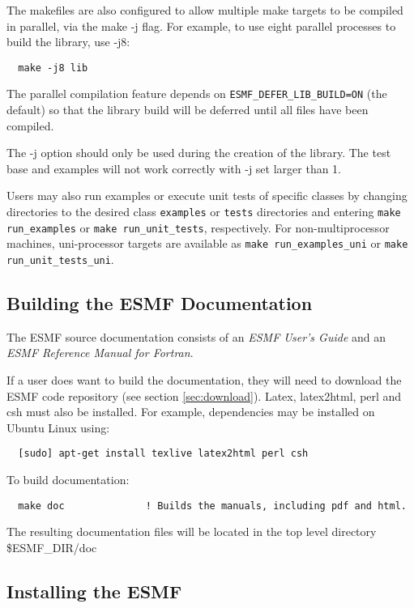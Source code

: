 The makefiles are also configured to allow multiple make targets to be
compiled in parallel, via the make -j flag.  For example, to use eight
parallel processes to build the library, use -j8:
\begin{verbatim}
  make -j8 lib
\end{verbatim}

The parallel compilation feature depends on {\tt ESMF\_DEFER\_LIB\_BUILD=ON}
(the default) so that the library build will be deferred until all files
have been compiled.

The -j option should only be used during the creation of the library.
The test base and examples will not work correctly with -j set larger
than 1.

Users may also run examples or execute unit tests of specific classes
by changing directories to the desired class {\tt examples} or {\tt tests}
directories and entering {\tt make run\_examples} or
{\tt make run\_unit\_tests}, respectively.  For non-multiprocessor machines,
uni-processor targets are available as {\tt make run\_examples\_uni} or
{\tt make run\_unit\_tests\_uni}.

\subsection{Building the ESMF Documentation}
\label{BuildDocumentation}

The ESMF source documentation consists of an {\it ESMF User's Guide}
and an {\it ESMF Reference Manual for Fortran}.

If a user does want to build the documentation, they will need to download the
ESMF code repository (see section \ref{sec:download}). Latex, latex2html, perl
and csh must also be installed. For example, dependencies may be installed on
Ubuntu Linux using:
\begin{verbatim}
  [sudo] apt-get install texlive latex2html perl csh
\end{verbatim}

\noindent To build documentation:
\begin{verbatim}
  make doc              ! Builds the manuals, including pdf and html.
\end{verbatim}

\noindent The resulting documentation files will be
located in the top level directory \${ESMF\_DIR}/doc

\subsection{Installing the ESMF}
\label{InstallESMF}


